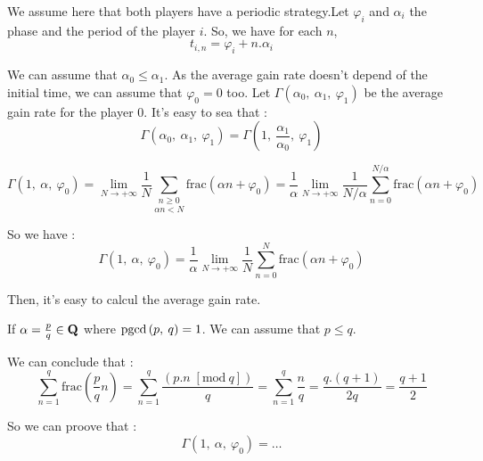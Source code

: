 We assume here that both players have a periodic strategy.Let $ \varphi_i $ and 
$ \alpha_i $ the phase and the period of the player $i$. So, we have for each $n$,
\[ t_{i,n} = \varphi_i + n.\alpha_i \]

We can assume that $\alpha_0 \leq \alpha_1 $. 
As the average gain rate doesn't depend of the initial time, we can assume that $ \varphi_0 = 0 $ too.
Let $ \Gamma\left(\alpha_0,\:\alpha_1,\:\varphi_1\right) $ be the average gain rate for the player $ 0 $.
It's easy to sea that :
\[ \Gamma\left(\alpha_0,\:\alpha_1,\:\varphi_1\right) = \Gamma\left(1,\:\frac{\alpha_1}{\alpha_0},\:\varphi_1\right) \]


\[
\Gamma\left(1,\:\alpha,\:\varphi_{0}\right)=\lim_{N\rightarrow+\infty}\frac{1}{N}
\underset{\alpha n<N}{\underset{n\geq0}{\sum}}\mathrm{frac}\left(\alpha n+\varphi_{0}\right)
=\frac{1}{\alpha}\lim_{N\rightarrow+\infty}\frac{1}{N/\alpha}
\underset{n=0}{\overset{N/\alpha}{\sum}}\mathrm{frac}\left(\alpha n+\varphi_{0}\right)\]

So we have :\[
\Gamma\left(1,\:\alpha,\:\varphi_{0}\right)=\frac{1}{\alpha}\lim_{N\rightarrow+\infty}\frac{1}{N}
\underset{n=0}{\overset{N}{\sum}}\mathrm{frac}\left(\alpha n+\varphi_{0}\right)\]

Then, it's easy to calcul the average gain rate.

If $\alpha=\frac{p}{q}\in\textbf{Q}$ where $\mathrm{pgcd}\left(p,\: q\right)=1$.
We can assume that $ p \leq q $.

We can conclude that :\[
\underset{n=1}{\overset{q}{\sum}}\mathrm{frac}\left(\frac{p}{q}n\right)
=\underset{n=1}{\overset{q}{\sum}}\frac{\left(p.n\;\left[\mathrm{mod}\: q\right]\right)}{q}
=\underset{n=1}{\overset{q}{\sum}}\frac{n}{q}=\frac{q.\left(q+1\right)}{2q}=\frac{q+1}{2}\]

So we can proove that : \[
\Gamma\left(1,\:\alpha,\:\varphi_{0}\right)=\dots
\]
